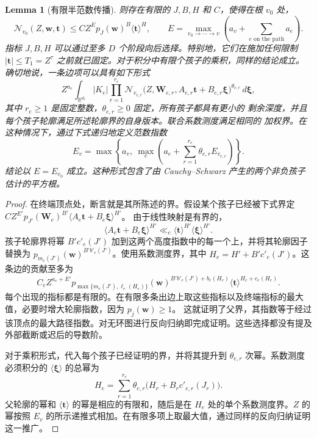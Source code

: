 \documentclass[11pt,a4paper]{article}
\numberwithin{equation}{section}
\numberwithin{figure}{section}
\newtheorem{lemma}[theorem]{Lemma}
\theoremstyle{definition}
\theoremstyle{remark}
\begin{document}
\begin{lemma}[有限半范数传播]
则存在有限的 $J,B,H$ 和 $C$，使得在根 $v_0$ 处，
\[
 \mathcal N_{v_0}(Z,\boldsymbol w,\boldsymbol t)
 \le C Z^E p_J(\boldsymbol w)^B\langle\boldsymbol t\rangle^H,
 \qquad
 E=\max_{v_0\to\cdots\to v}
       \left(a_v+\sum_{e\text{ on the path}}a_e\right).
\]
指标 $J,B,H$ 可以通过至多 $D$ 个阶段向后选择。特别地，它们在施加任何限制
$|\boldsymbol t|\le T_1=Z^\tau$ 之前就已固定。对于积分中有限个孩子的乘积，同样的结论成立。
确切地说，一条边项可以具有如下形式
\[
 Z^{a_e}\int_{\mathbb R^{d_e}}|K_e|
 \prod_{r=1}^{r_e}
 \mathcal N_{v_{e,r}}\bigl(Z,\boldsymbol W_{e,r},
       A_{e,r}\boldsymbol t+B_{e,r}\boldsymbol\xi\bigr)^{\theta_{e,r}}
 \,d\boldsymbol\xi,
\]
其中 $r_e\ge1$ 是固定整数，$\theta_{e,r}\ge0$ 固定，所有孩子都具有更小的
剩余深度，并且每个孩子轮廓满足所述轮廓界的自身版本。联合系数测度满足相同的
加权界。在这种情况下，通过下式递归地定义范数指数
\[
 E_v=\max\left\{a_v,\ \max_e
             \left(a_e+\sum_{r=1}^{r_e}\theta_{e,r}E_{v_{e,r}}\right)\right\}.
\]
结论以 $E=E_{v_0}$ 成立。这种形式包含了由 Cauchy--Schwarz 产生的两个非负孩子估计的平方根。
\end{lemma}

\begin{proof}
在终端顶点处，断言就是其所陈述的界。假设某个孩子已经被下式界定
$C Z^{E'}p_{J'}(\boldsymbol W_e)^{B'}
 \langle A_e\boldsymbol t+B_e\boldsymbol\xi\rangle^{H'}$。
由于线性映射是有界的，
\[
 \langle A_e\boldsymbol t+B_e\boldsymbol\xi\rangle^{H'}
 \ll_e\langle\boldsymbol t\rangle^{H'}
              \langle\boldsymbol\xi\rangle^{H'}.
\]
孩子轮廓界将幂 $B'c'_e(J')$ 加到这两个高度指数中的每一个上，并将其轮廓因子替换为
$p_{m_e(J')}(\boldsymbol w)^{B'b'_e(J')}$。使用系数测度界，其中
$H_e=H'+B'c'_e(J')$。这条边的贡献至多为
\[
 C_e Z^{a_e+E'}
 p_{\max\{m_e(J'),\ell_e(H_e)\}}(\boldsymbol w)^{B'b'_e(J')+b_e(H_e)}
 \langle\boldsymbol t\rangle^{H_e+c_e(H_e)}.
\]
每个出现的指标都是有限的。在有限多条出边上取这些指标以及终端指标的最大值，必要时增大轮廓指数，因为 $p_j(\boldsymbol w)\ge1$。
这就证明了父界，其指数等于经过该顶点的最大路径指数。对无环图进行反向归纳即完成证明。这些选择都没有提及外部截断或迟后的导数阶。

对于乘积形式，代入每个孩子已经证明的界，并将其提升到 $\theta_{e,r}$ 次幂。系数测度必须积分的
$\langle\boldsymbol\xi\rangle$ 的总幂为
\[
 H_e=\sum_{r=1}^{r_e}\theta_{e,r}
       \bigl(H_r+B_r c'_{e,r}(J_r)\bigr).
\]
父轮廓的幂和 $\langle\boldsymbol t\rangle$ 的幂是相应的有限和，随后是在 $H_e$ 处的单个系数测度界。$Z$ 的幂按照 $E_v$ 的所示递推式相加。在有限多项上取最大值，通过同样的反向归纳证明这一推广。
\end{proof}
\end{document}

